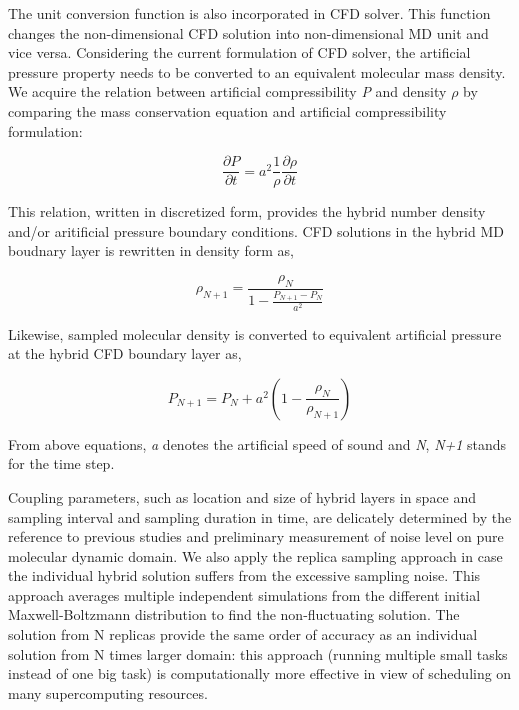 \documentclass[]{aiaa-tc}%
\begin{document}
The unit conversion function is also incorporated in CFD solver. This function changes
the non-dimensional CFD solution into non-dimensional MD unit and vice versa. 
Considering the current formulation of CFD solver, the artificial pressure property
needs to be converted to an equivalent molecular mass density. We acquire the relation
between artificial compressibility {\it{P}} and density $\rho$ by comparing 
the mass conservation equation and artificial compressibility formulation:

\begin{equation}
\frac{\partial P}{\partial t} = {a}^2 \frac{1}{\rho} \frac{\partial \rho}{\partial t}
\label{eq:Ar_Co1}
\end{equation}

This relation, written in discretized form, provides the hybrid number density
and/or aritificial pressure boundary conditions. CFD solutions in the hybrid 
MD boudnary layer is rewritten in density form as,

\begin{equation}
\rho_{N+1} = \frac{\rho_{N}}{1 - \frac{P_{N+1} - P_{N}}{a^2}}
\label{eq:Ar_Co2}
\end{equation}

Likewise, sampled molecular density is converted to equivalent artificial pressure
at the hybrid CFD boundary layer as,

\begin{equation}
P_{N+1} = P_{N} + a^2 ( 1 - \frac{\rho_{N}}{\rho_{N+1}} )
\label{eq:Ar_Co3}
\end{equation}

From above equations, {\it{a}} denotes the artificial speed of sound and {\it{N}},
{\it{N+1}} stands for the time step.

Coupling parameters, such as location and size of hybrid layers in space and 
sampling interval and sampling duration in time, are delicately determined 
by the reference to previous studies\cite{Nie,Yen,Liu,Hadjicon2,Werder,Flekkoy,Delgado1}
and preliminary measurement of noise level on pure molecular dynamic domain.
We also apply the replica sampling approach\cite{REMD} in case the individual 
hybrid solution suffers from the excessive sampling noise. This approach averages 
multiple independent simulations from the different initial Maxwell-Boltzmann 
distribution to find the non-fluctuating solution. The solution from N replicas 
provide the same order of accuracy as an individual solution from N times larger 
domain: this approach (running multiple small tasks instead of one big task) is 
computationally more effective in view of scheduling on many supercomputing
resources.
\end{document}
